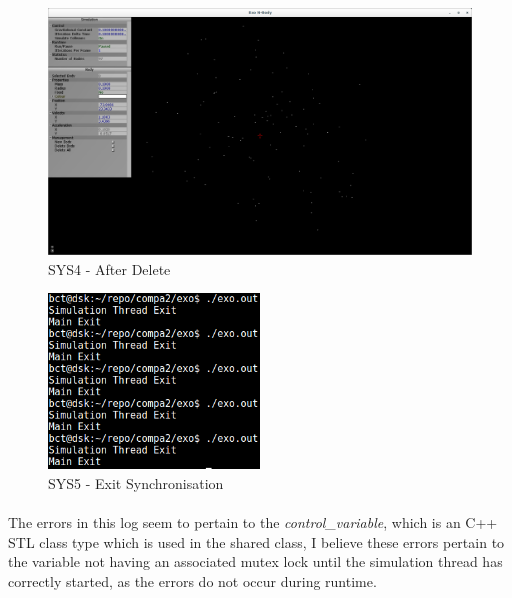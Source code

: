 \begin{figure}[H]
  \centering
  \includegraphics[width=\textwidth]{img/testingEvidence/sys4_1.png}
  \caption{SYS4 - After Delete}
\end{figure}

\pagebreak

\begin{figure}[H]
  \centering
  \includegraphics[width=0.5\textwidth]{img/testingEvidence/sys5.png}
  \caption{SYS5 - Exit Synchronisation}
\end{figure}



\paragraph{}
The errors in this log seem to pertain to the \textit{control\_variable}, which is an C++ STL class type which is used in the shared class, I believe these errors pertain to the variable not having an associated mutex lock until the simulation thread has correctly started, as the errors do not occur during runtime.

\pagebreak

